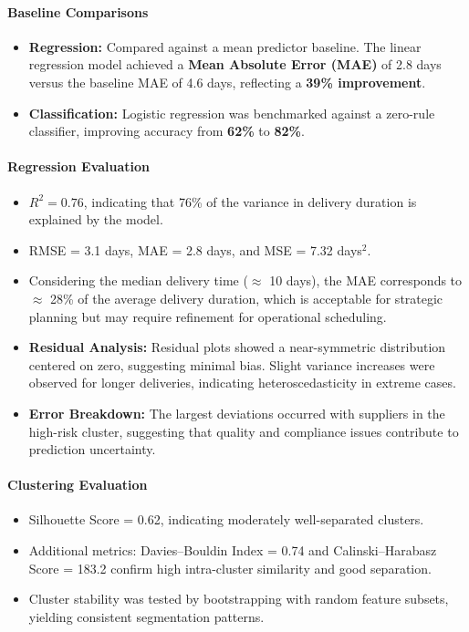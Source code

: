 \documentclass[10pt, twocolumn]{article}
\begin{document}
\paragraph{Baseline Comparisons}
\begin{itemize}
    \item \textbf{Regression:} Compared against a mean predictor baseline. The linear regression model achieved a \textbf{Mean Absolute Error (MAE)} of 2.8 days versus the baseline MAE of 4.6 days, reflecting a \textbf{39\% improvement}.
    \item \textbf{Classification:} Logistic regression was benchmarked against a zero-rule classifier, improving accuracy from \textbf{62\%} to \textbf{82\%}.
\end{itemize}

\paragraph{Regression Evaluation}
\begin{itemize}
    \item $R^2 = 0.76$, indicating that 76\% of the variance in delivery duration is explained by the model.
    \item RMSE = 3.1 days, MAE = 2.8 days, and MSE = 7.32 days$^2$.
    \item Considering the median delivery time ($\approx$ 10 days), the MAE corresponds to $\approx$ 28\% of the average delivery duration, which is acceptable for strategic planning but may require refinement for operational scheduling.
    \item \textbf{Residual Analysis:} Residual plots showed a near-symmetric distribution centered on zero, suggesting minimal bias. Slight variance increases were observed for longer deliveries, indicating heteroscedasticity in extreme cases.
    \item \textbf{Error Breakdown:} The largest deviations occurred with suppliers in the high-risk cluster, suggesting that quality and compliance issues contribute to prediction uncertainty.
\end{itemize}

\paragraph{Clustering Evaluation}
\begin{itemize}
    \item Silhouette Score = 0.62, indicating moderately well-separated clusters.
    \item Additional metrics: Davies–Bouldin Index = 0.74 and Calinski–Harabasz Score = 183.2 confirm high intra-cluster similarity and good separation.
    \item Cluster stability was tested by bootstrapping with random feature subsets, yielding consistent segmentation patterns.
\end{itemize}
\end{document}
